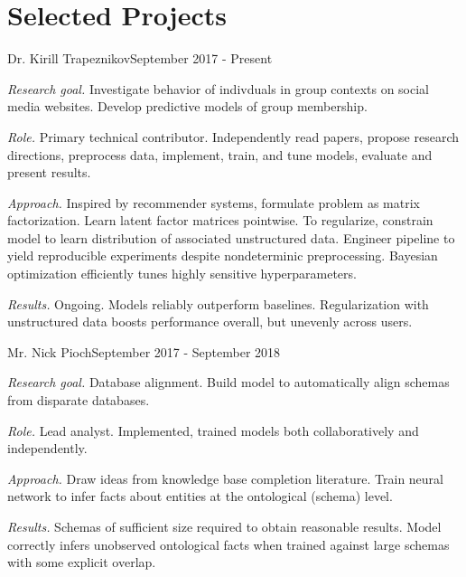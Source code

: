 \documentclass[10pt]{article}
\begin{document}
\section{Selected Projects}

		{Dr. Kirill Trapeznikov}{September 2017 - Present}
		{\begin{itemize-noindent}
			\item{\textit{Research goal.} Investigate behavior of indivduals in group contexts on social media websites. Develop predictive models of group membership.}
			\item{\textit{Role.} Primary technical contributor. Independently read papers, propose research directions, preprocess data, implement, train, and tune models, evaluate and present results.}
			\item{\textit{Approach.} Inspired by recommender systems, formulate problem as matrix factorization. Learn latent factor matrices pointwise. To regularize, constrain model to learn distribution of associated unstructured data. Engineer pipeline to yield reproducible experiments despite nondeterminic preprocessing. Bayesian optimization efficiently tunes highly sensitive hyperparameters.}
			\item{\textit{Results.} Ongoing. Models reliably outperform baselines. Regularization with unstructured data boosts performance overall, but unevenly across users. }
		\end{itemize-noindent}}

		{Mr. Nick Pioch}{September 2017 - September 2018}
		{\begin{itemize-noindent}
			\item{\textit{Research goal.} Database alignment. Build model to automatically align schemas from disparate databases.}
			\item{\textit{Role.} Lead analyst. Implemented, trained models both collaboratively and independently.}
			\item{\textit{Approach.} Draw ideas from knowledge base completion literature. Train neural network to infer facts about entities at the ontological (schema) level.}
			\item{\textit{Results.} Schemas of sufficient size required to obtain reasonable results. Model correctly infers unobserved ontological facts when trained against large schemas with some explicit overlap.}
		\end{itemize-noindent}}
\end{document}
